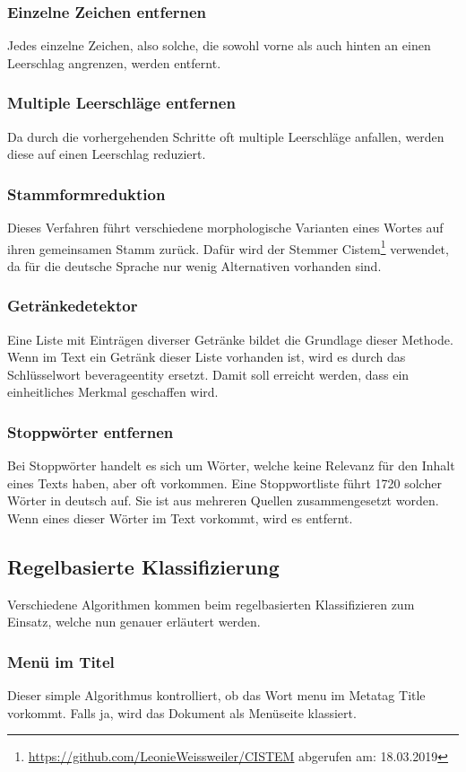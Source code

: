 \subsubsection{Einzelne Zeichen entfernen}
Jedes einzelne Zeichen, also solche, die sowohl vorne als auch hinten an einen Leerschlag angrenzen, werden entfernt.
\subsubsection{Multiple Leerschläge entfernen}
Da durch die vorhergehenden Schritte oft multiple Leerschläge anfallen, werden diese auf einen Leerschlag reduziert.
\subsubsection{Stammformreduktion}
Dieses Verfahren führt verschiedene morphologische Varianten eines Wortes auf ihren gemeinsamen Stamm zurück.
Dafür wird der Stemmer \glqq Cistem\footnote{\url{https://github.com/LeonieWeissweiler/CISTEM} abgerufen am: 18.03.2019}\grqq{} verwendet, da für die deutsche Sprache nur wenig Alternativen vorhanden sind. 
\subsubsection{Getränkedetektor}
Eine Liste mit Einträgen diverser Getränke bildet die Grundlage dieser Methode.
Wenn im Text ein Getränk dieser Liste vorhanden ist, wird es durch das Schlüsselwort \glqq beverageentity\grqq{} ersetzt.
Damit soll erreicht werden, dass ein einheitliches Merkmal geschaffen wird.
\subsubsection{Stoppwörter entfernen}
Bei Stoppwörter handelt es sich um Wörter, welche keine Relevanz für den Inhalt eines Texts haben, aber oft vorkommen.
Eine Stoppwortliste führt 1720 solcher Wörter in deutsch auf. Sie ist aus mehreren Quellen zusammengesetzt worden.
Wenn eines dieser Wörter im Text vorkommt, wird es entfernt.
\subsection{Regelbasierte Klassifizierung}
Verschiedene Algorithmen kommen beim regelbasierten Klassifizieren zum Einsatz, welche nun genauer erläutert werden.
\subsubsection{Menü im Titel}
Dieser simple Algorithmus kontrolliert, ob das Wort \glqq menu\grqq{} im Metatag \glqq Title\grqq{} vorkommt.
Falls ja, wird das Dokument als Menüseite klassiert.
